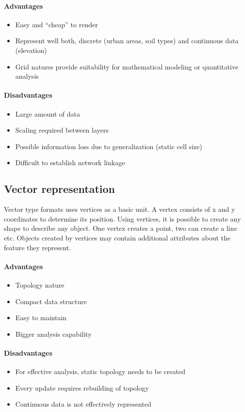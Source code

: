 \documentclass[thesis=M,english]{FITthesis}[2012/10/20]
\begin{document}
\paragraph*{Advantages}
\begin{itemize}[noitemsep]
\item Easy and ``cheap'' to render
\item Represent well both, discrete (urban areas, soil types) and continuous data (elevation)
\item Grid natures provide suitability for mathematical modeling or quantitative analysis
\end{itemize}

\paragraph*{Disadvantages}
\begin{itemize}[noitemsep]
\item Large amount of data
\item Scaling required between layers
\item Possible information loss due to generalization (static cell size)
\item Difficult to establish network linkage
\end{itemize}

\subsection{Vector representation}
Vector type formats uses vertices as a basic unit. A vertex consists of x and y coordinates to determine its position. Using vertices, it is possible to create any shape to describe any object. One vertex creates a point, two can create a line etc. Objects created by vertices may contain additional attributes about the feature they represent.

\paragraph*{Advantages}
\begin{itemize}[noitemsep]
\item Topology nature
\item Compact data structure
\item Easy to maintain
\item Bigger analysis capability
\end{itemize}

\paragraph*{Disadvantages}
\begin{itemize}[noitemsep]
\item For effective analysis, static topology needs to be created
\item Every update requires rebuilding of topology
\item Continuous data is not effectively represented
\end{itemize}
\end{document}
